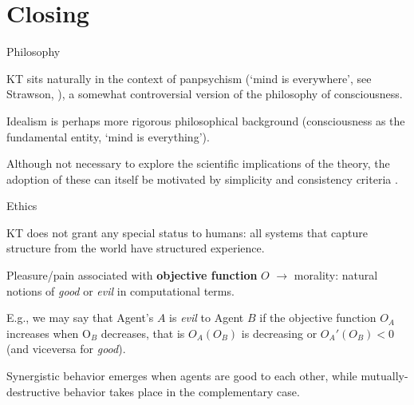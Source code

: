 \section{Closing}



\begin{frame}[label=ladila]{Philosophy}

KT sits naturally in the context of panpsychism (`mind is everywhere', see Strawson, \cite{Goff:2019aa}), a  somewhat controversial version of the philosophy of consciousness.  \vfill

Idealism is  perhaps more rigorous philosophical background (consciousness as the fundamental entity, `mind is everything'). \vfill

 Although not necessary to explore the scientific implications of the theory, the adoption of these can itself be  motivated by simplicity and consistency criteria \citep{Symes2022-ri}.
 
\end{frame}



\begin{frame}[label=ladila]{Ethics}

KT does not grant any special status to humans: all systems that capture structure from the world have structured experience.  \vfill

Pleasure/pain associated with  {\bf objective function} $O$ $\rightarrow$ morality:  natural notions of {\em good} or {\em evil} in computational terms. \vfill

E.g., we may say that Agent's $A$ is {\em evil} to Agent $B$ if the objective function   $O_A$ increases when O$_B$ decreases, that is $O_A(O_B)$ is decreasing or  $O_A'(O_B) <0$ (and viceversa for {\em good}).
 \vfill
 

Synergistic behavior emerges when agents are good to each other, while mutually-destructive behavior takes place in the complementary case.  
 
\end{frame}

